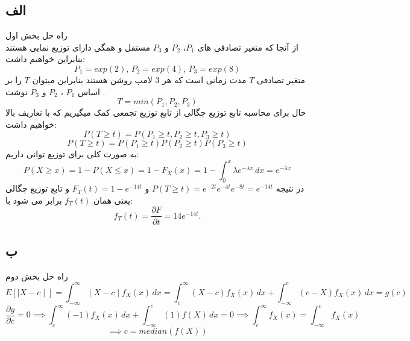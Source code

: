 

\subsection*{الف}
راه حل بخش اول \\ 
از آنجا که متغیر تصادفی های $P_1$، $P_2$ و $P_3$ مستقل و همگی دارای توزیع نمایی هستند بنابراین خواهیم داشت: 
$$
P_1 = exp(2) , \,   P_2 = exp(4) , \,   P_3 = exp(8)
$$
 متغیر تصادفی $T$ مدت زمانی است که هر 3 لامپ روشن هستند بنابراین میتوان $T$ را بر اساس   $P_1 $ ، $P_2 $ و $P_3 $ نوشت .
$$
T = min(P_1, P_2, P_3)
$$
 حال برای محاسبه تابع توزیع چگالی از تابع توزیع تجمعی کمک میگیریم که با تعاریف بالا خواهیم داشت:
$$ 
P(T \ge t) = P( P_1 \geq t , P_2 \geq t, P_3 \geq t)
$$
$$
P(T \geq t) = P( P_1 \geq t) P( P_2 \geq t) P( P_3 \geq t)  
$$
به صورت کلی برای توزیع توانی داریم: 
$$
P(X \geq x) = 1 - P(X \leq x) = 1 - F_X(x) = 1 - \int_{0}^{x} \lambda e^{-\lambda x} \, dx = e^{-\lambda x}
$$
در نتیجه 
$  P(T \geq t) = e^{-2t}e^{-4t}e^{-8t} = e ^{-14t}
$
 و 
$
F_T(t) = 1 - e ^ {-14t}
$ 
و تابع توزیع چگالی یعنی همان $f_T(t) $ برابر می شود با:
$$ f_T(t) = \frac{\partial F}{\partial t} = 14e^{-14t} .
$$
\subsection*{ب}
راه حل بخش دوم \\
$$
E[\mid X-c \mid ] =\int_{-\infty}^ {\infty} \mid X-c \mid f_X(x) \, dx =\int_{c}^{\infty} (X-c)f_X(x) \, dx +\int_{-\infty}^{c} (c - X)f_X(x) \, dx = g(c)
$$
$$
 \frac{\partial g}{\partial c} = 0 \implies \int_{c}^{\infty}(−1)f_X(x) \, dx + \int_{-\infty}^{c}(1)f(X) \, dx = 0 \implies \int_{c}^{\infty} f_X(x)=\int_{-\infty}^{c}f_X(x)
$$
$$
 \implies c = median(f(X))
$$
